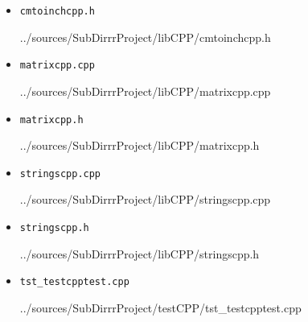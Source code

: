 \documentclass[12pt,a4paper]{report}
\begin{document}
\begin{itemize}
\item[] \verb-cmtoinchcpp.h-

{../sources/SubDirrrProject/libCPP/cmtoinchcpp.h}

%

%

\item[] \verb-matrixcpp.cpp-

{../sources/SubDirrrProject/libCPP/matrixcpp.cpp}

\item[] \verb-matrixcpp.h-

{../sources/SubDirrrProject/libCPP/matrixcpp.h}

\item[] \verb-stringscpp.cpp-

{../sources/SubDirrrProject/libCPP/stringscpp.cpp}

\item[] \verb-stringscpp.h-

{../sources/SubDirrrProject/libCPP/stringscpp.h}

\item[] \verb-tst_testcpptest.cpp-

{../sources/SubDirrrProject/testCPP/tst_testcpptest.cpp}

\end{itemize}
\end{document}

